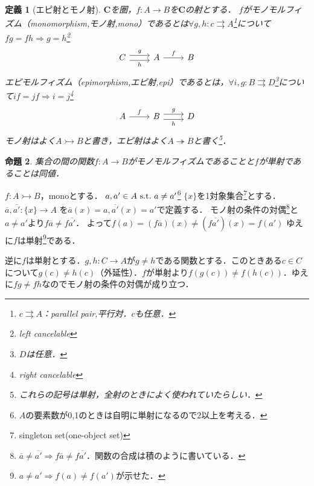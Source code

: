 \documentclass[dvipdfmx,a4j,10pt]{jsarticle}
\makeatletter
\theoremstyle{mystyle1}
\newtheorem{dfn}{定義}[section]
\newtheorem{prop}[dfn]{命題}
\theoremstyle{mystyle2}
\renewenvironment{proof}[1][\proofname]{\par
  \pushQED{\qed}%
  \normalfont
  \topsep6\p@\@plus6\p@ \trivlist
  \item[\hskip\labelsep{\bfseries\sffamily #1}]\ignorespaces
}{%
  \popQED\endtrivlist\@endpefalse
}
\renewcommand\proofname{証明}
\makeatother
\begin{document}
	\setcounter{dfn}{0}

	\begin{dfn}[エピ射とモノ射]
		$\mathbf{C}$を圏，$f:A\to B$を$\mathbf{C}$の射とする．
		$f$がモノモルフィズム（monomorphism,モノ射,mono）であるとは$\forall g,h:c\rightrightarrows A$\footnote{$c\rightrightarrows A$：parallel pair,平行対．$c$も任意．}について$fg=fh\Rightarrow g=h$\footnote{left cancelable}
		\begin{equation}
			\begin{tikzcd}
				C \arrow[r,yshift=0.7ex,"g"] \arrow[r,yshift=-0.7ex,"h"'] & A \arrow[r,"f"] & B
			\end{tikzcd}
		\end{equation}
		エピモルフィズム（epimorphism,エピ射,epi）であるとは，$\forall i,g:B\rightrightarrows D$\footnote{$D$は任意．}について$if=jf\Rightarrow i=j$\footnote{right cancelable}
		\begin{equation}
			\begin{tikzcd}
				A \arrow[r,"f"] & B \arrow[r,yshift=0.7ex,"g"] \arrow[r,yshift=-0.7ex,"h"'] & D
			\end{tikzcd}
		\end{equation}
		モノ射はよく$A\rightarrowtail B$と書き，エピ射はよく$A\twoheadrightarrow B$と書く\footnote{これらの記号は単射，全射のときによく使われていたらしい．}．
	\end{dfn}

	\begin{prop}
		集合の間の関数$f:A\to B$がモノモルフィズムであることと$f$が単射であることは同値．
	\end{prop}

	\begin{proof}
		$f:A\rightarrowtail B$，monoとする．
		$a,a'\in A\textrm{\,\,s.t.\,\,} a\neq a'$\footnote{$A$の要素数が0,1のときは自明に単射になるので2以上を考える．}
		$\{x\}$を1対象集合\footnote{singleton set(one-object set)}とする．
		$\overline{a},\overline{a'}:\{x\}\to A$
		を$\overline{a}(x)=a,\overline{a'}(x)=a'$で定義する．
		モノ射の条件の対偶\footnote{$\overline{a}\neq\overline{a'}\Rightarrow f\overline{a}\neq f\overline{a'}$．関数の合成は積のように書いている．}と$a\neq a'$より$f\overline{a}\neq f\overline{a'}$．
		よって$f(a)=(f\overline{a})(x)\neq(f\overline{a'})(x)=f(a')$
		ゆえに$f$は単射\footnote{$a\neq a'\Rightarrow f(a)\neq f(a')$が示せた．}である．

		逆に$f$は単射とする．$g,h:C\to A$が$g\neq h$である関数とする．このときある$c\in C$について$g(c)\neq h(c)$（外延性）．$f$が単射より$f(g(c))\neq f(h(c))$．ゆえに$fg\neq fh$なのでモノ射の条件の対偶が成り立つ．
	\end{proof}
\end{document}
